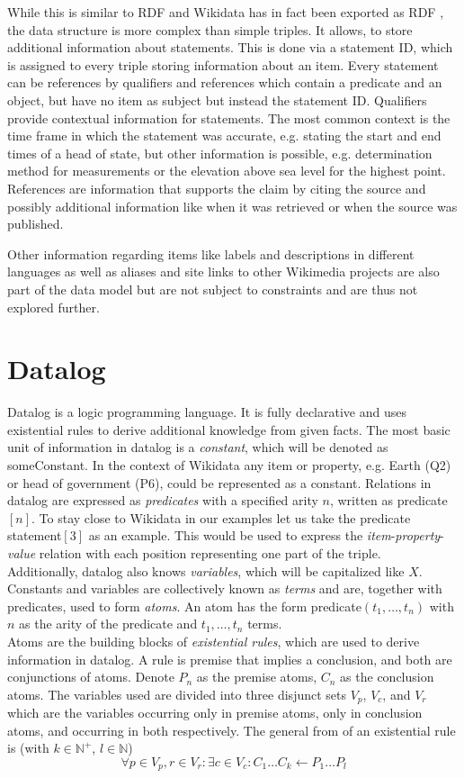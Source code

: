 \documentclass[hyperref,bachelorofscience,fleqn]{cgvpub}
\begin{document}
While this is similar to RDF and Wikidata has in fact been exported as RDF \cite{EGKMV2014}, the data structure is more complex than simple triples. It allows, to store additional information about statements. This is done via a statement ID, which is assigned to every triple storing information about an item. Every statement can be references by qualifiers and references which contain a predicate and an object, but have no item as subject but instead the statement ID. Qualifiers provide contextual information for statements. The most common context is the time frame in which the statement was accurate, e.g. stating the start and end times of a head of state, but other information is possible, e.g. determination method for measurements or the elevation above sea level for the highest point. References are information that supports the claim by citing the source and possibly additional information like when it was retrieved or when the source was published.

Other information regarding items like labels and descriptions in different languages as well as aliases and site links to other Wikimedia projects are also part of the data model but are not subject to constraints and are thus not explored further.
\section{Datalog}
Datalog is a logic programming language. It is fully declarative and uses existential rules to derive additional knowledge from given facts. The most basic unit of information in datalog is a \emph{constant}, which will be denoted as someConstant. In the context of Wikidata any item or property, e.g. Earth (Q2) or head of government (P6), could be represented as a constant. Relations in datalog are expressed as \emph{predicates} with a specified arity \(n\), written as predicate\([n]\). To stay close to Wikidata in our examples let us take the predicate statement\([3]\) as an example. This would be used to express the \emph{item}-\emph{property}-\emph{value} relation with each position representing one part of the triple.\\
Additionally, datalog also knows \emph{variables}, which will be capitalized like \(X\). Constants and variables are collectively known as \emph{terms} and are, together with predicates, used to form \emph{atoms}. An atom has the form predicate\((t_1, \ldots , t_n)\) with \(n\) as the arity of the predicate and \(t_1,\ldots,t_n\) terms.\\
Atoms are the building blocks of \emph{existential rules}, which are used to derive information in datalog. A rule is premise that implies a conclusion, and both are conjunctions of atoms. Denote \(P_n\) as the premise atoms, \(C_n\) as the conclusion atoms. The variables used are divided into three disjunct sets \(V_p\), \(V_c\), and \(V_r\) which are the variables occurring only in premise atoms, only in conclusion atoms, and occurring in both respectively. The general from of an existential rule is (with \(k \in \mathbb{N}^+\), \(l \in \mathbb{N}\))
\begin{equation*}
\forall p \in V_p, r \in V_r : \exists c \in V_c: C_1 \ldots C_k \leftarrow P_1 \ldots P_l
\end{equation*}
\end{document}
